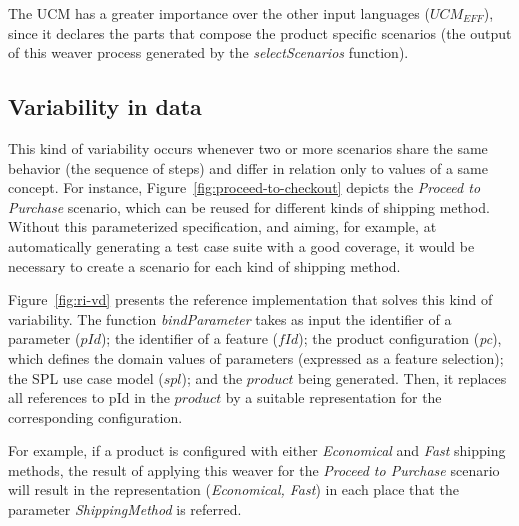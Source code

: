 \documentclass{acm_proc_article-sp}
\begin{document}
The UCM has a greater importance over the other input languages ($UCM_{EFF}$),
since it declares the parts that compose the product specific scenarios (the
output of this weaver process generated by the \emph{selectScenarios} function).

\subsection{Variability in data}\label{sub:bind-weaver}

This kind of variability occurs whenever two or more scenarios share the same
behavior (the sequence of steps) and differ in relation only to values of a same
concept. For instance, Figure~\ref{fig:proceed-to-checkout} depicts the
\emph{Proceed to Purchase} scenario, which can be reused for different kinds of
shipping method. Without this parameterized specification, and aiming, for
example, at automatically generating a test case suite with a good coverage, it
would be necessary to create a scenario for each kind of shipping method. 



Figure~\ref{fig:ri-vd} presents the reference implementation that solves this
kind of variability. The function \emph{bindParameter} takes as input the
identifier of a parameter ($pId$); the identifier of a feature ($fId$); the
product configuration (\emph{pc}), which defines the domain values of
parameters (expressed as a feature selection); the SPL use case model ($spl$);
and the $product$ being generated. Then, it replaces all references to
pId in the $product$ by a suitable representation for the corresponding
configuration. 


For example, if a product is configured with either \emph{Economical} and
\emph{Fast} shipping methods, the result of applying this weaver for
the \emph{Proceed to Purchase} scenario will result in the
representation (\emph{Economical, Fast}) in each place that the parameter
\emph{ShippingMethod} is referred.
\end{document}

